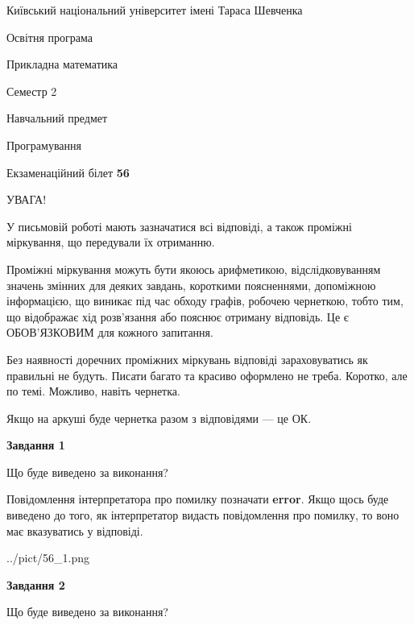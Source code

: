 \documentclass[12pt, ukrainian]{article}
\begin{document}
{{\begin {small}\par
{ \center  Київський національний університет імені Тараса Шевченка \par}
{\parbox {5 cm}{Освітня програма \hfill}{\parbox {7 cm}{Прикладна математика \hfill}}\parbox {6 cm}{\hfill Семестр 2}}\par
{\parbox {5 cm} {Навчальний предмет \hfill}\parbox {7 cm}{Програмування \hfill}\parbox {6cm}{\hfill}\par}\vspace{-7pt} \end{small}}{\center Екзаменаційний білет \No \textbf
{ 56 }\par}}
{
\begin {large}
УВАГА!

У письмовій роботі мають зазначатися всі відповіді, а також проміжні міркування, що передували їх отриманню.

Проміжні міркування можуть бути якоюсь арифметикою, відслідковуванням зна\-чень змінних для деяких завдань,
короткими поясненнями, допоміжною інформацією, що виникає під час обходу графів, робочею чернеткою,
тобто тим, що відображає хід розв’язання або пояснює отриману відповідь.
Це є ОБОВ’ЯЗКОВИМ для кожного запитання.

Без наявності доречних проміжних міркувань відповіді зараховуватись як правиль\-ні не будуть.
Писати багато та красиво оформлено не треба. Коротко, але по темі. Можли\-во, навіть чернетка.

Якщо на аркуші буде чернетка разом з відповідями --- це ОК.

\newpage

{\begin {center}\textbf{Завдання 1}\end {center}}\par
Що буде виведено за виконання?

Повідомлення інтерпретатора про помилку позначати \textbf{error}.
Якщо щось буде виведено до того, як інтерпретатор видасть повідомлення про помилку, 
то воно має вказуватись у відповіді. \par


\begin{center}
	{../pict/56_1.png}
\end{center}
\newpage

{\begin {center}\textbf{Завдання 2}\end {center}}\par
Що буде виведено за виконання?


\end{large}}
\end{document}
